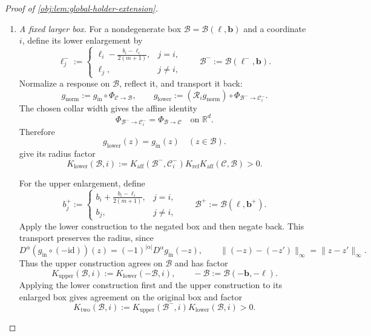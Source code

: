 \documentclass[11pt]{article}
\begin{document}
\begin{proof}[Proof of \cref{obj:lem:global-holder-extension}]
\begin{enumerate}
\item\label{proof:global-holder-extension:larger-box} \emph{A fixed larger box.}
For a nondegenerate box
\(\mathcal B=\mathcal B(\boldsymbol\ell,\boldsymbol b)\) and a coordinate \(i\), define its lower enlargement by
\[
\ell_j^-:=
\begin{cases}
\displaystyle\ell_i-\frac{b_i-\ell_i}{2(m+1)},&j=i,\\
\ell_j,&j\ne i,
\end{cases}
\qquad
\mathcal B^-:=\mathcal B(\boldsymbol\ell^-,\boldsymbol b).
\]
Normalize a response on \(\mathcal B\), reflect it, and transport it back:
\[
g_{\mathrm{norm}}
:=g_{\mathrm{in}}\circ\Phi_{\mathcal C\to\mathcal B},
\qquad
g_{\mathrm{lower}}
:=(\mathscr R_i g_{\mathrm{norm}})
\circ\Phi_{\mathcal B^-\to\mathcal C_i^-}.
\]
The chosen collar width gives the affine identity
\[
\Phi_{\mathcal B^-\to\mathcal C_i^-}
=\Phi_{\mathcal B\to\mathcal C}
\quad\text{on }\mathbb R^d.
\]
Therefore
\[
g_{\mathrm{lower}}(z)=g_{\mathrm{in}}(z)
\quad(z\in\mathcal B).
\]
 give its radius factor
\[
K_{\mathrm{lower}}(\mathcal B,i)
:=
K_{\mathrm{aff}}(\mathcal B^-,\mathcal C_i^-)
K_{\mathrm{ref}}
K_{\mathrm{aff}}(\mathcal C,\mathcal B)>0.
\]

For the upper enlargement, define
\[
b_j^+:=
\begin{cases}
\displaystyle b_i+\frac{b_i-\ell_i}{2(m+1)},&j=i,\\
b_j,&j\ne i,
\end{cases}
\qquad
\mathcal B^+:=\mathcal B(\boldsymbol\ell,\boldsymbol b^+).
\]
Apply the lower construction to the negated box and then negate back. This transport preserves the radius, since
\[
D^\alpha(g_{\mathrm{in}}\circ(-\mathrm{id}))(z)
=(-1)^{|\alpha|}D^\alpha g_{\mathrm{in}}(-z),
\qquad
\|(-z)-(-z')\|_\infty=\|z-z'\|_\infty.
\]
Thus the upper construction agrees on \(\mathcal B\) and has factor
\[
K_{\mathrm{upper}}(\mathcal B,i)
:=K_{\mathrm{lower}}(-\mathcal B,i),
\qquad
-\mathcal B:=\mathcal B(-\boldsymbol b,-\boldsymbol\ell).
\]
Applying the lower construction first and the upper construction to its enlarged box gives agreement on the original box and factor
\[
K_{\mathrm{two}}(\mathcal B,i)
:=K_{\mathrm{upper}}(\mathcal B^-,i)
K_{\mathrm{lower}}(\mathcal B,i)>0.
\]


\end{enumerate}
\end{proof}
\end{document}

